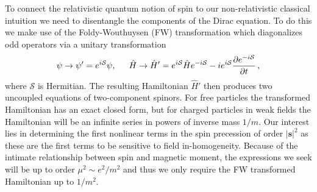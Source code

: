 To connect the relativistic quantum notion of spin to our non-relativistic classical intuition we need to disentangle the components of the Dirac equation. To do this we make use of the Foldy-Wouthuysen (FW) transformation which diagonalizes odd operators via a unitary transformation
\begin{alignat}{1}
  \label{FW01} \psi\rightarrow\psi'=e^{i\mathcal{S}}\psi,\indent\hat{H}\rightarrow\hat{H}'=e^{i\mathcal{S}}\hat{H}e^{-i\mathcal{S}}-ie^{i\mathcal{S}}\frac{\partial e^{-i\mathcal{S}}}{\partial t}\,,
\end{alignat}
where $\mathcal{S}$ is Hermitian. The resulting Hamiltonian $\hat{H}'$ then produces two uncoupled equations of two-component spinors. For free particles the transformed Hamiltonian has an exact closed form, but for charged particles in weak fields the Hamiltonian will be an infinite series in powers of inverse mass $1/m$. Our interest lies in determining the first nonlinear terms in the spin precession of order $|\mathbf{s}|^{2}$ as these are the first terms to be sensitive to field in-homogeneity. Because of the intimate relationship between spin and magnetic moment, the expressions we seek will be up to order $\mu^{2}\sim e^{2}/m^{2}$ and thus we only require the FW transformed Hamiltonian up to $1/m^{2}$.

